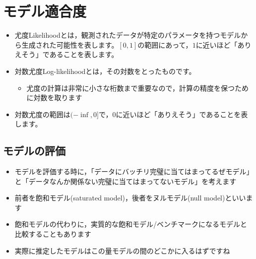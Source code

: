 \documentclass[
  a4paper,
]{ltjsbook}
\providecommand{\tightlist}{%
  \setlength{\itemsep}{0pt}\setlength{\parskip}{0pt}}\usepackage{longtable,booktabs,array}
\begin{document}
\section{モデル適合度}\label{ux30e2ux30c7ux30ebux9069ux5408ux5ea6}

\begin{itemize}
\tightlist
\item
  尤度Likelihoodとは，観測されたデータが特定のパラメータを持つモデルから生成された可能性を表します。\([0,1]\)の範囲にあって，\(1\)に近いほど「ありえそう」であることを表します。
\item
  対数尤度Log-likelihoodとは，その対数をとったものです。

  \begin{itemize}
  \tightlist
  \item
    尤度の計算は非常に小さな桁数まで重要なので，計算の精度を保つために対数を取ります
  \end{itemize}
\item
  対数尤度の範囲は\((-\inf,0]\)で，\(0\)に近いほど「ありえそう」であることを表します。
\end{itemize}

\subsection{モデルの評価}\label{ux30e2ux30c7ux30ebux306eux8a55ux4fa1}

\begin{itemize}
\tightlist
\item
  モデルを評価する時に，「データにバッチリ完璧に当てはまってるぜモデル」と「データなんか関係ない完璧に当てはまってないモデル」を考えます
\item
  前者を飽和モデル(saturated model)，後者をヌルモデル(null
  model)といいます
\item
  飽和モデルの代わりに，実質的な飽和モデル/ベンチマークになるモデルと比較することもあります
\item
  実際に推定したモデルはこの量モデルの間のどこかに入るはずですね
\end{itemize}
\end{document}
